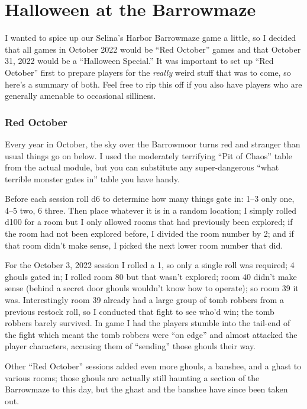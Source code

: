 
\section{Halloween at the Barrowmaze}

I wanted to spice up our Selina's Harbor Barrowmaze game a little, so I decided
that all games in October 2022 would be ``Red October'' games and that October
31, 2022 would be a ``Halloween Special.'' It was important to set up
``Red October'' first to prepare players for the \emph{really} weird stuff that
was to come, so here's a summary of both. Feel free to rip this off if you also
have players who are generally amenable to occasional silliness.

\subsubsection{Red October}

Every year in October, the sky over the Barrowmoor turns red and stranger than
usual things go on below. I used the moderately terrifying ``Pit of Chaos''
table from the actual module, but you can substitute any super-dangerous ``what
terrible monster gates in'' table you have handy.

Before each session roll d6 to determine how many things gate in: 1--3 only
one, 4--5 two, 6 three. Then place whatever it is in a random location; I simply
rolled d100 for a room but I only allowed rooms that had previously been
explored; if the room had not been explored before, I divided the room number
by 2; and if that room didn't make sense, I picked the next lower room number
that did.

For the October 3, 2022 session I rolled a 1, so only a single roll was required;
4 ghouls gated in; I rolled room 80 but that wasn't explored; room 40 didn't
make sense (behind a secret door ghouls wouldn't know how to operate); so room
39 it was. Interestingly room 39 already had a large group of tomb robbers from
a previous restock roll, so I conducted that fight to see who'd win; the tomb
robbers barely survived. In game I had the players stumble into the tail-end of
the fight which meant the tomb robbers were ``on edge'' and almost attacked the
player characters, accusing them of ``sending'' those ghouls their way.

Other ``Red October'' sessions added even more ghouls, a banshee, and a ghast
to various rooms; those ghouls are actually still haunting a section of the
Barrowmaze to this day, but the ghast and the banshee have since been taken out.

